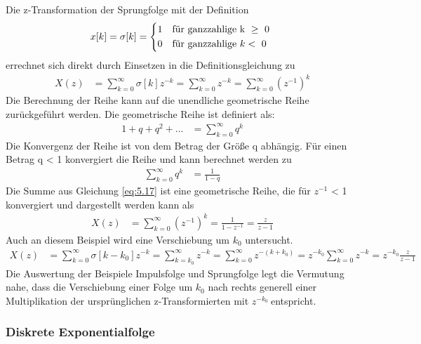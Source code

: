 Die z-Transformation der Sprungfolge mit der Definition
\begin{align}
x[ k] = \sigma[ k] = \begin{dcases}
    1 & \text{f}\text{ü}\text{r ganzzahlige k } \geq \text{ 0} \\
    0 & \text{f}\text{ü}\text{r ganzzahlige }k < \text{ 0}
\end{dcases}\ \label{eq:5.16}
\end{align}
errechnet sich direkt durch Einsetzen in die Definitionsgleichung zu
\begin{align}
X(z) &= \sum\limits_{k = 0}^{\infty}{\sigma[ k]  z^{- k}} = \sum\limits_{k = 0}^{\infty}z^{- k} = \sum\limits_{k = 0}^{\infty}\left( z^{- 1} \right)^{k} \label{eq:5.17}
\end{align}
Die Berechnung der Reihe kann auf die unendliche geometrische Reihe zurückgeführt werden. Die geometrische Reihe ist definiert als:
\begin{align}
1 + q + q^{2} + ... &= \sum\limits_{k = 0}^{\infty}q^{k} \label{eq:5.18}
\end{align}
Die Konvergenz der Reihe ist von dem Betrag der Größe q abhängig. Für einen Betrag \textbar q\textbar{} \textless{} 1 konvergiert die Reihe und kann berechnet werden zu
\begin{align}
\sum\limits_{k = 0}^{\infty}q^{k} &= \frac{1}{1 - q} \label{eq:5.19}
\end{align}
Die Summe aus Gleichung \eqref{eq:5.17} ist eine geometrische Reihe, die für \textbar \(z^{-1}\)\textbar{} \textless{} 1 konvergiert und dargestellt werden kann als
\begin{align}
X(z) &= \sum\limits_{k = 0}^{\infty}\left( z^{- 1} \right)^{k} = \frac{1}{1 - z^{- 1}} = \frac{z}{z - 1} \label{eq:5.20}
\end{align}
Auch an diesem Beispiel wird eine Verschiebung um \(k_{0}\) untersucht.
\begin{align}
X(z) &= \sum\limits_{k = 0}^{\infty}{\sigma\left[ k - k_{0} \right]  z^{- k}} = \sum\limits_{k = k_{0}}^{\infty}z^{- k} = \sum\limits_{k = 0}^{\infty}z^{- (k + k_{0})} = z^{- k_{0}}  \sum\limits_{k = 0}^{\infty}z^{- k} = z^{- k_{0}}  \frac{z}{z - 1} \label{eq:5.21}
\end{align}
Die Auswertung der Beispiele Impulsfolge und Sprungfolge legt die Vermutung nahe, dass die Verschiebung einer Folge um \(k_{0}\) nach rechts generell einer Multiplikation der ursprünglichen z-Transformierten mit \(z^{- k_{0}}\ \)entspricht.

\subsubsection{Diskrete Exponentialfolge}\label{sec:diskrete-exponentialfolge}

